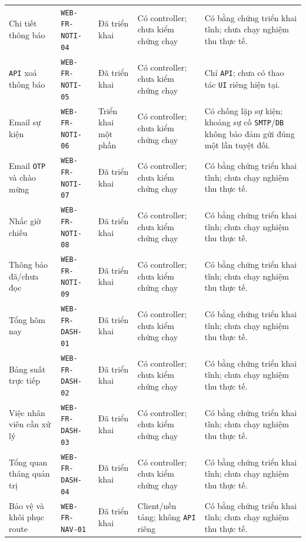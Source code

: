 \begin{longtable}{@{}P{0.19000\SRSWidth}P{0.18000\SRSWidth}P{0.15000\SRSWidth}P{0.20000\SRSWidth}P{0.28000\SRSWidth}@{}}
Chi tiết thông báo & \texttt{WEB-\allowbreak{}FR-\allowbreak{}NOTI-\allowbreak{}04} & Đã triển khai & Có controller; chưa kiểm chứng chạy & Có bằng chứng triển khai tĩnh; chưa chạy nghiệm thu thực tế. \\[3pt]
\texttt{API} xoá thông báo & \texttt{WEB-\allowbreak{}FR-\allowbreak{}NOTI-\allowbreak{}05} & Đã triển khai & Có controller; chưa kiểm chứng chạy & Chỉ \texttt{API}; chưa có thao tác \texttt{UI} riêng hiện tại. \\[3pt]
Email sự kiện & \texttt{WEB-\allowbreak{}FR-\allowbreak{}NOTI-\allowbreak{}06} & Triển khai một phần & Có controller; chưa kiểm chứng chạy & Có chống lặp sự kiện; khoảng sự cố \texttt{SMTP}/\allowbreak{}\texttt{DB} không bảo đảm gửi đúng một lần tuyệt đối. \\[3pt]
Email \texttt{OTP} và chào mừng & \texttt{WEB-\allowbreak{}FR-\allowbreak{}NOTI-\allowbreak{}07} & Đã triển khai & Có controller; chưa kiểm chứng chạy & Có bằng chứng triển khai tĩnh; chưa chạy nghiệm thu thực tế. \\[3pt]
Nhắc giờ chiếu & \texttt{WEB-\allowbreak{}FR-\allowbreak{}NOTI-\allowbreak{}08} & Đã triển khai & Có controller; chưa kiểm chứng chạy & Có bằng chứng triển khai tĩnh; chưa chạy nghiệm thu thực tế. \\[3pt]
Thông báo đã/\allowbreak{}chưa đọc & \texttt{WEB-\allowbreak{}FR-\allowbreak{}NOTI-\allowbreak{}09} & Đã triển khai & Có controller; chưa kiểm chứng chạy & Có bằng chứng triển khai tĩnh; chưa chạy nghiệm thu thực tế. \\[3pt]
Tổng hôm nay & \texttt{WEB-\allowbreak{}FR-\allowbreak{}DASH-\allowbreak{}01} & Đã triển khai & Có controller; chưa kiểm chứng chạy & Có bằng chứng triển khai tĩnh; chưa chạy nghiệm thu thực tế. \\[3pt]
Bảng suất trực tiếp & \texttt{WEB-\allowbreak{}FR-\allowbreak{}DASH-\allowbreak{}02} & Đã triển khai & Có controller; chưa kiểm chứng chạy & Có bằng chứng triển khai tĩnh; chưa chạy nghiệm thu thực tế. \\[3pt]
Việc nhân viên cần xử lý & \texttt{WEB-\allowbreak{}FR-\allowbreak{}DASH-\allowbreak{}03} & Đã triển khai & Có controller; chưa kiểm chứng chạy & Có bằng chứng triển khai tĩnh; chưa chạy nghiệm thu thực tế. \\[3pt]
Tổng quan tháng quản trị & \texttt{WEB-\allowbreak{}FR-\allowbreak{}DASH-\allowbreak{}04} & Đã triển khai & Có controller; chưa kiểm chứng chạy & Có bằng chứng triển khai tĩnh; chưa chạy nghiệm thu thực tế. \\[3pt]
Bảo vệ và khôi phục route & \texttt{WEB-\allowbreak{}FR-\allowbreak{}NAV-\allowbreak{}01} & Đã triển khai & Client/\allowbreak{}nền tảng; không \texttt{API} riêng & Có bằng chứng triển khai tĩnh; chưa chạy nghiệm thu thực tế. \\[3pt]

\end{longtable}
